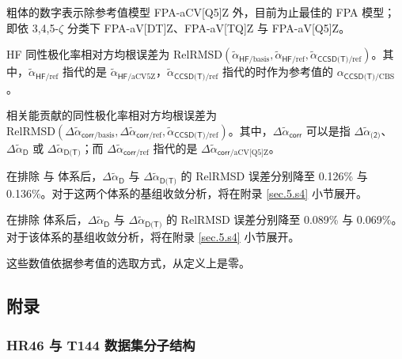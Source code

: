 \begin{table}[ht]
    \raggedright
    \par{} 粗体的数字表示除参考值模型 FPA-aCV[Q5]Z 外，目前为止最佳的 FPA 模型；即依 3,4,5-$\zeta$ 分类下 FPA-aV[DT]Z、FPA-aV[TQ]Z 与 FPA-aV[Q5]Z。
    \par{} HF 同性极化率相对方均根误差为 $\text{RelRMSD} (\tilde \alpha_{\textsf{HF}/\text{basis}}, \tilde \alpha_{\textsf{HF}/\text{ref}}, \tilde \alpha_{\textsf{CCSD(T)}/\text{ref}})$。其中，$\tilde \alpha_{\textsf{HF}/\text{ref}}$ 指代的是 $\tilde \alpha_{\textsf{HF}/\text{aCV5Z}}$，$\tilde \alpha_{\textsf{CCSD(T)}/\text{ref}}$ 指代的时作为参考值的 $\alpha_{\textsf{CCSD(T)}/\text{CBS}}$。
    \par{} 相关能贡献的同性极化率相对方均根误差为 $\text{RelRMSD} (\Delta \tilde \alpha_{\textsf{corr}/\text{basis}}, \Delta \tilde \alpha_{\textsf{corr}/\text{ref}}, \tilde \alpha_{\textsf{CCSD(T)}/\text{ref}})$。其中，$\Delta \tilde \alpha_{\textsf{corr}}$ 可以是指 $\Delta \tilde \alpha_{\textsf{(2)}}$、$\Delta \tilde \alpha_{\textsf{D}}$ 或 $\Delta \tilde \alpha_{\textsf{D(T)}}$；而 $\Delta \tilde \alpha_{\textsf{corr}/\text{ref}}$ 指代的是 $\Delta \tilde \alpha_{\textsf{corr}/\text{aCV[Q5]Z}}$。
    \par{} 在排除  与  体系后，$\Delta \tilde \alpha_\textsf{D}$ 与 $\Delta \tilde \alpha_\textsf{D(T)}$ 的 RelRMSD 误差分别降至 0.126\% 与 0.136\%。对于这两个体系的基组收敛分析，将在附录 \ref{sec.5.s4} 小节展开。
    \par{} 在排除  体系后，$\Delta \tilde \alpha_\textsf{D}$ 与 $\Delta \tilde \alpha_\textsf{D(T)}$ 的 RelRMSD 误差分别降至 0.089\% 与 0.069\%。对于该体系的基组收敛分析，将在附录 \ref{sec.5.s4} 小节展开。
    \par{} 这些数值依据参考值的选取方式，从定义上是零。
\end{table}

\newpage

\subsection{附录}

\subsubsection{HR46 与 T144 数据集分子结构}

